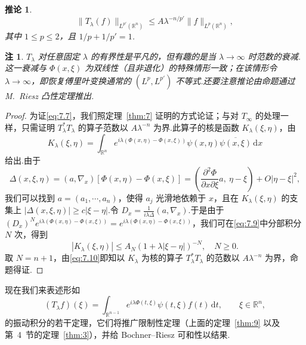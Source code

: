 \documentclass[
  BookTitleCN={傅里叶分析中的振动积分},
  BookTitleEN={Oscillatory Integrals in Fourier Analysis},
  OriginalAuthor={E.~M. Stein},
  OriginalEdition={Proc. Sympos. Pure Math. 35, Part~1},
  OriginalPublisher={American Mathematical Society},
  OriginalYear={1979},
  Translator={翻译及重排},
  ModelUsed={Codex CLI},
  Biblatex=false,
  TranslationDate={2026年8月27日}
]{mathtranslation}
\numberwithin{equation}{chapter}   %
\newtheorem*{corollary*}{推论}
\newtheorem*{remark*}{注}
\newcommand{\R}{\mathbb{R}}
\begin{document}
\begin{corollary*}
  \begin{equation}
    \|T_{\lambda}(f)\|_{L^{p'}(\R^{n})}\leq A\lambda^{-n/p'}\|f\|_{L^{p}(\R^{n})}, \label{eq:7.8}
  \end{equation}
  其中 $1\leq p\leq2$，且 $1/p+1/p'=1$.
\end{corollary*}

\begin{remark*}
  $T_{\lambda}$ 对任意固定 $\lambda$ 的有界性是平凡的，但有趣的是当 $\lambda\to\infty$ 时范数的衰减.这一衰减与 $\Phi(x,\xi)$ 为双线性（且非退化）的特殊情形一致；在该情形令 $\lambda\to\infty$，即恢复傅里叶变换通常的 $(L^{p},L^{p'})$ 不等式.还要注意推论由命题通过 M.~Riesz 凸性定理推出.
\end{remark*}

\begin{proof}
  为证\eqref{eq:7.7}，我们照定理~\ref{thm:7} 证明的方式论证；与对 $T_{\infty}$ 的处理一样，只需证明 $T_{\lambda}^{*}T_{\lambda}$ 的算子范数以 $A\lambda^{-n}$ 为界.此算子的核是函数 $K_{\lambda}(\xi,\eta)$，由
  \begin{equation}
    K_{\lambda}(\xi,\eta)=\int_{\R^{n}}e^{i\lambda(\Phi(x,\eta)-\Phi(x,\xi))}\psi(x,\eta)\overline{\psi(x,\xi)}\,\mathrm{d}x \label{eq:7.9}
  \end{equation}
  给出.由于
  \[
    \Delta(x,\xi,\eta)=(a,\nabla_{x})[\Phi(x,\eta)-\Phi(x,\xi)]=\left(\frac{\partial^{2}\Phi}{\partial x\partial\xi}a,\ \eta-\xi\right)+O|\eta-\xi|^{2},
  \]
  我们可以找到 $a=(a_{1},\cdots,a_{n})$，使得 $a_{j}$ 光滑地依赖于 $x$，且在 $K_{\lambda}(\xi,\eta)$ 的支集上 $|\Delta(x,\xi,\eta)|\geq c|\xi-\eta|$.令 $D_{x}=\frac{1}{i\lambda\Delta}(a,\nabla_{x})$.于是由于 $(D_{x})^{N}e^{i\lambda(\Phi(x,\eta)-\Phi(x,\xi))}=e^{i\lambda(\Phi(x,\eta)-\Phi(x,\xi))}$，我们可在\eqref{eq:7.9}中分部积分 $N$ 次，得到
  \begin{equation}
    |K_{\lambda}(\xi,\eta)|\leq A_{N}(1+\lambda|\xi-\eta|)^{-N},\quad N\geq0 . \label{eq:7.10}
  \end{equation}
  取 $N=n+1$，由\eqref{eq:7.10}即知以 $K_{\lambda}$ 为核的算子 $T_{\lambda}^{*}T_{\lambda}$ 的范数以 $A\lambda^{-n}$ 为界，命题得证.
\end{proof}

\noindent 现在我们来表述形如
\begin{equation}
  (T_{\lambda}f)(\xi)=\int_{\R^{n-1}}e^{i\lambda\Phi(t,\xi)}\psi(t,\xi)f(t)\,\mathrm{d}t,\qquad\xi\in\R^{n}, \label{eq:7.11}
\end{equation}
的振动积分的若干定理，它们将推广限制性定理（上面的定理~\ref{thm:9} 以及第~4~节的定理~\ref{thm:3}），并给 Bochner--Riesz 可和性以结果.
\end{document}
